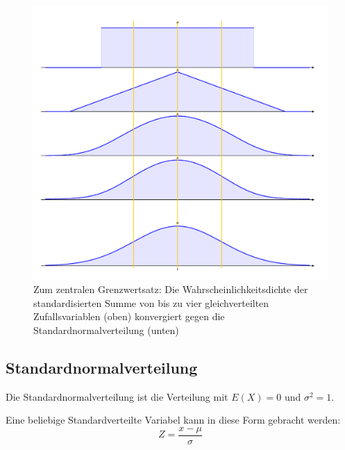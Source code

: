 \documentclass[../Main.tex]{subfiles}
\begin{document}
\begin{figure}[H]
    \centering
    \includegraphics[width=0.75\linewidth]{Images/central-limit.png}
    \caption{Zum zentralen Grenzwertsatz: Die Wahrscheinlichkeitsdichte der standardisierten Summe von
    bis zu vier gleichverteilten Zufallsvariablen (oben) konvergiert gegen die Standardnormalverteilung (unten)}
\end{figure}



\subsection{Standardnormalverteilung}
Die Standardnormalverteilung ist die Verteilung mit \(E(X)=0\) und
\(\sigma^2 = 1\).

Eine beliebige Standardverteilte Variabel kann in diese Form gebracht werden:
\begin{equation}
    Z = \frac{x-\mu}{\sigma}
\end{equation}
\end{document}
